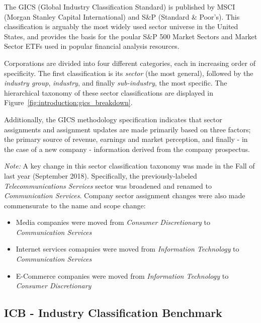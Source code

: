 \documentclass[../main.tex]{subfiles}
\begin{document}
The GICS (Global Industry Classification Standard) is published by MSCI (Morgan Stanley Capital International) and S\&P (Standard \& Poor's). This classification is arguably the most widely used sector universe in the United States, and provides the basis for the poular S\&P 500 Market Sectors and Market Sector ETFs used in popular financial analysis resources.

Corporations are divided into four different categories, each in increasing order of specificity. The first classification is its \textit{sector} (the most general), followed by the \textit{industry group}, \textit{industry}, and finally \textit{sub-industry}, the most specific. The hierarchical taxonomy of these sector classifications are displayed in Figure~\ref{fig:introduction:gics_breakdown}.

Additionally, the GICS methodology specification indicates that sector assignments and assignment updates are made primarily based on three factors; the primary source of revenue, earnings and market perception, and finally - in the case of a new company - information derived from the company prospectus.

\textit{Note:} A key change in this sector classification taxonomy was made in the Fall of last year (September 2018). Specifically, the previously-labeled \textit{Telecommunications Services} sector was broadened and renamed to \textit{Communication Services}. Company sector assignment changes were also made commensurate to the name and scope change:

\begin{itemize}
    \item Media companies were moved from \textit{Consumer Discretionary} to \textit{Communication Services}
    \item Internet services comapnies were moved from \textit{Information Technology} to \textit{Communication Services}
    \item E-Commerce companies were moved from \textit{Information Technology} to \textit{Consumer Discretionary}
\end{itemize}

\subsection{ICB - Industry Classification Benchmark}
\end{document}
